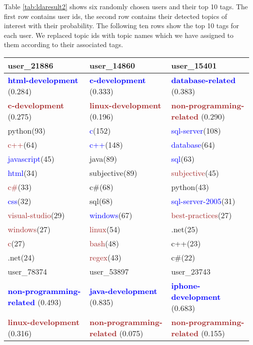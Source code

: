 Table \ref{tab:ldaresult2} shows six randomly chosen users and their top 10 tags. The first row contains user ids, the second row contains their detected topics of interest with their probability. The following ten rows show the top 10 tags for each user. We replaced topic ids with topic names which we have assigned to them according to their associated tags.
\begin{sidewaystable}%
\centering
\begin{tabular}{l|l|l}
\hline
user\_21886&user\_14860&user\_15401\\
\hline
\textbf{\textcolor{blue}{html-development}} (0.284)  & \textbf{\textcolor{blue}{c-development}} (0.333) &\textbf{\textcolor{blue}{database-related}} (0.383)\\
 \textbf{\textcolor{brown}{c-development}} (0.275) &  \textbf{\textcolor{brown}{linux-development}} (0.196)& \textbf{\textcolor{brown}{non-programming-related}} (0.290)\\

\hline
python(93)&\textcolor{blue}{c}(152)&\textcolor{blue}{sql-server}(108)\\
\textcolor{brown}{c++}(64)&\textcolor{blue}{c++}(148)&\textcolor{blue}{database}(64)\\
\textcolor{blue}{javascript}(45)&java(89)&\textcolor{blue}{sql}(63)\\
\textcolor{blue}{html}(34)&subjective(89)&\textcolor{brown}{subjective}(45)\\
\textcolor{brown}{c\#}(33)&c\#(68)&python(43)\\
\textcolor{blue}{css}(32)&sql(68)&\textcolor{blue}{sql-server-2005}(31)\\
\textcolor{brown}{visual-studio}(29)&\textcolor{blue}{windows}(67)&\textcolor{brown}{best-practices}(27)\\
\textcolor{brown}{windows}(27)&\textcolor{brown}{linux}(54)&.net(25)\\
\textcolor{brown}{c}(27)&\textcolor{brown}{bash}(48)&c++(23)\\
.net(24)&\textcolor{brown}{regex}(43)&c\#(22)\\
\hline
\hline
user\_78374&user\_53897&user\_23743\\
\hline
\textbf{\textcolor{blue}{non-programming-related}} (0.493)&\textbf{\textcolor{blue}{java-development}} (0.835)&\textbf{\textcolor{blue}{iphone-development}} (0.683)\\
\textbf{\textcolor{brown}{linux-development}} (0.316)&\textbf{\textcolor{brown}{non-programming-related}} (0.075)& \textbf{\textcolor{brown}{non-programming-related}} (0.155)\\


\end{tabular}
\end{sidewaystable}
